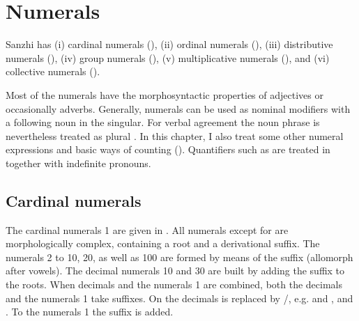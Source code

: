 \chapter{Numerals}
\label{cpt:numerals}

Sanzhi has (i) cardinal numerals (), (ii) ordinal numerals (), (iii) distributive numerals (), (iv) group numerals (), (v) multiplicative numerals (), and (vi) collective numerals ().

Most of the numerals have the morphosyntactic properties of adjectives or occasionally adverbs. Generally, numerals can be used as nominal modifiers with a following noun in the singular. For verbal agreement the noun phrase is nevertheless treated as plural . In this chapter, I also treat some other numeral expressions and basic ways of counting (). Quantifiers such as  are treated in  together with indefinite pronouns.




\section{Cardinal numerals}
\label{sec:cardinalnumerals}

The cardinal numerals 1 are given in . All numerals except for   are morphologically complex, containing a root and a derivational suffix. The numerals 2 to 10, 20, as well as 100 are formed by means of the suffix  (allomorph  after vowels). The decimal numerals 10 and 30 are built by adding the suffix  to the roots. When decimals and the numerals 1 are combined, both the decimals and the numerals 1 take suffixes. On the decimals  is replaced by \slash{}, e.g.   and ,   and . To the numerals 1 the suffix  is added.

